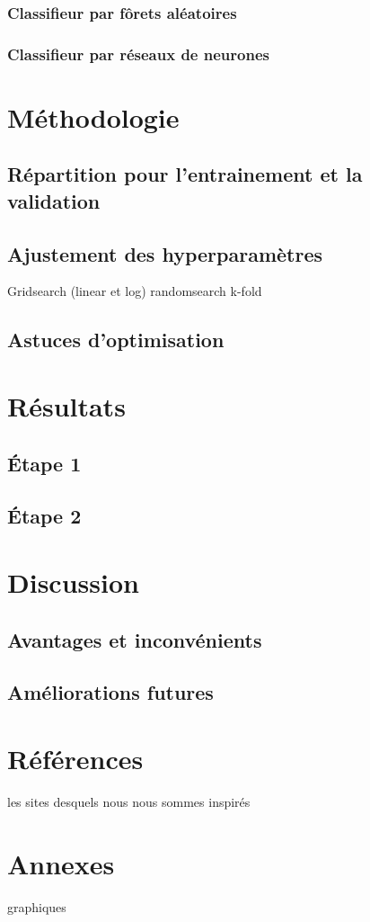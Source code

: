 \documentclass{article}
\begin{document}
\subsubsection{Classifieur par fôrets aléatoires}
\subsubsection{Classifieur par réseaux de neurones}

\section{Méthodologie}
\subsection{Répartition pour l'entrainement et la validation}
\subsection{Ajustement des hyperparamètres}
Gridsearch (linear et log)
randomsearch
k-fold

\subsection{Astuces d'optimisation}

\section{Résultats}
\subsection{Étape 1}
\subsection{Étape 2}

\section{Discussion}
\subsection{Avantages et inconvénients}
\subsection{Améliorations futures}

\section{Références}
les sites desquels nous nous sommes inspirés

\section{Annexes}
graphiques
\end{document}
